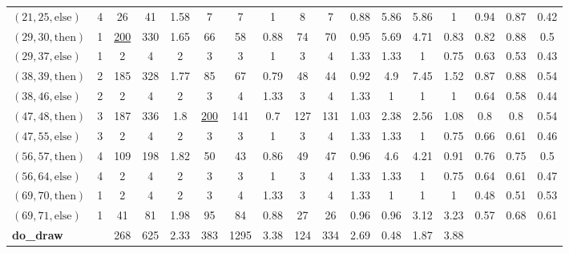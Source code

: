 \documentclass[sigconf]{acmart}
\newcommand{\thenBr}{\text{then}}
\newcommand{\elseBr}{\text{else}}
\newcommand{\un}[1]{\underline{#1}}
\begin{document}
\begin{table}[!t]
\begin{tabular}{lc|ccc|ccc|ccc|ccc|ccc}
    $(21,25,\elseBr)$ & 4        & 26       & 41   & 1.58      & 7    & 7   & 1             & 8   & 7   & 0.88             & 5.86   & 5.86  & 1      & 0.94 & 0.87 & 0.42  \\
    $(29,30,\thenBr)$ & 1        & \un{200} & 330  & 1.65      & 66   & 58  & 0.88          & 74  & 70  & 0.95             & 5.69   & 4.71  & 0.83   & 0.82 & 0.88 & 0.5   \\
    $(29,37,\elseBr)$ & 1        & 2        & 4    & 2         & 3    & 3   & 1             & 3   & 4   & 1.33             & 1.33   & 1     & 0.75   & 0.63 & 0.53 & 0.43  \\
    $(38,39,\thenBr)$ & 2        & 185      & 328  & 1.77      & 85   & 67  & 0.79          & 48  & 44  & 0.92             & 4.9    & 7.45  & 1.52   & 0.87 & 0.88 & 0.54  \\
    $(38,46,\elseBr)$ & 2        & 2        & 4    & 2         & 3    & 4   & 1.33          & 3   & 4   & 1.33             & 1      & 1     & 1      & 0.64 & 0.58 & 0.44  \\
    $(47,48,\thenBr)$ & 3        & 187      & 336  & 1.8       & \un{200} & 141 & 0.7       & 127 & 131 & 1.03             & 2.38   & 2.56  & 1.08   & 0.8  & 0.8  & 0.54  \\
    $(47,55,\elseBr)$ & 3        & 2        & 4    & 2         & 3    & 3   & 1             & 3   & 4   & 1.33             & 1.33   & 1     & 0.75   & 0.66 & 0.61 & 0.46  \\
    $(56,57,\thenBr)$ & 4        & 109      & 198  & 1.82      & 50   & 43  & 0.86          & 49  & 47  & 0.96             & 4.6    & 4.21  & 0.91   & 0.76 & 0.75 & 0.5   \\
    $(56,64,\elseBr)$ & 4        & 2        & 4    & 2         & 3    & 3   & 1             & 3   & 4   & 1.33             & 1.33   & 1     & 0.75   & 0.64 & 0.61 & 0.47  \\
    $(69,70,\thenBr)$ & 1        & 2        & 4    & 2         & 3    & 4   & 1.33          & 3   & 4   & 1.33             & 1      & 1     & 1      & 0.48 & 0.51 & 0.53  \\
    $(69,71,\elseBr)$ & 1        & 41       & 81   & 1.98      & 95   & 84  & 0.88          & 27  & 26  & 0.96             & 0.96   & 3.12  & 3.23   & 0.57 & 0.68 & 0.61  \\
    \toprule
    \multicolumn{2}{l|}{\textbf{do\_draw}}       
                                 & 268      & 625  & 2.33      & 383  & 1295 & 3.38         & 124 & 334 & 2.69             & 0.48   & 1.87  & 3.88   &      &      &       \\

\end{tabular}
\end{table}
\end{document}
